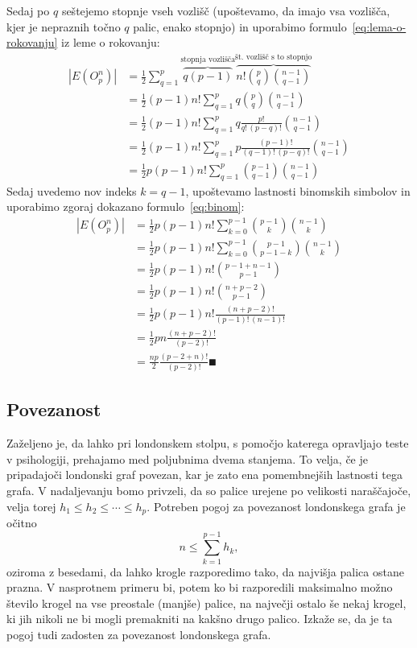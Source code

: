 \documentclass[twoside,11pt]{article}
\begin{document}
\begin{dokaz}
Sedaj po $q$ seštejemo stopnje vseh vozlišč (upoštevamo, da imajo vsa vozlišča, kjer je nepraznih točno $q$ palic, enako stopnjo) in uporabimo formulo~\eqref{eq:lema-o-rokovanju} iz leme o rokovanju:
\begin{align*}
|E(O^n_p)|
&= \frac{1}{2} \sum_{q=1}^{p} \overbrace{q(p-1)}^{\text{stopnja vozlišča}} 
\overbrace{n! {p \choose q} {n-1 \choose q-1} }^{\text{št.~vozlišč s to stopnjo}} \\
&= \frac{1}{2} (p-1) n! \sum_{q=1}^{p} q {p \choose q} {n-1 \choose q-1} \\
&= \frac{1}{2} (p-1) n! \sum_{q=1}^{p} q \frac{p!}{q! \, (p-q)!} {n-1 \choose q-1} \\
&= \frac{1}{2} (p-1) n! \sum_{q=1}^{p} p \frac{(p-1)!}{(q-1)! \, (p-q)!} {n-1 \choose q-1} \\
&= \frac{1}{2} p (p-1) n! \sum_{q=1}^{p} {p-1 \choose q-1} {n-1 \choose q-1}
\end{align*}
Sedaj uvedemo nov indeks $k = q-1$, upoštevamo lastnosti binomskih simbolov in uporabimo zgoraj dokazano formulo~\eqref{eq:binom}:
\begin{align*}
|E(O^n_p)|
&= \frac{1}{2} p (p-1) n! \sum_{k=0}^{p-1} {p-1 \choose k} {n-1 \choose k} \\
&= \frac{1}{2} p (p-1) n! \sum_{k=0}^{p-1} {p-1 \choose p-1-k} {n-1 \choose k} \\
&= \frac{1}{2} p (p-1) n! {p-1 + n-1 \choose p-1} \\
&= \frac{1}{2} p (p-1) n! {n + p - 2 \choose p-1} \\
&= \frac{1}{2} p (p-1) n! \frac{(n+p-2)!}{(p-1)!\,(n-1)!} \\
&= \frac{1}{2} p n \frac{(n+p-2)!}{(p-2)!} \\
&= \frac{np}{2} \frac{(p-2+n)!}{(p-2)!} \QED
\end{align*}
\end{dokaz}

\subsection{Povezanost}

Zaželjeno je, da lahko pri londonskem stolpu, s pomočjo katerega opravljajo teste v psihologiji, prehajamo med poljubnima dvema stanjema. To velja, če je pripadajoči londonski graf povezan, kar je zato ena pomembnejših lastnosti tega grafa.
V nadaljevanju bomo privzeli, da so palice urejene po velikosti naraščajoče, velja torej $h_1 \leq h_2 \leq \cdots \leq h_p$.
Potreben pogoj za povezanost londonskega grafa je očitno 
\[ n \leq \sum_{k=1}^{p-1} h_k, \]
oziroma z besedami, da lahko krogle razporedimo tako, da najvišja palica ostane prazna. V nasprotnem primeru bi, potem ko bi razporedili maksimalno možno število krogel na vse preostale (manjše) palice, na največji ostalo še nekaj krogel, ki jih nikoli ne bi mogli premakniti na kakšno drugo palico.
Izkaže se, da je ta pogoj tudi zadosten za povezanost londonskega grafa.
\end{document}
